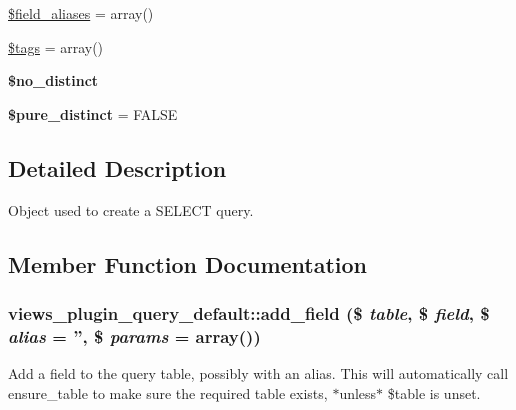 \begin{DoxyCompactItemize}
\item 
\hyperlink{classviews__plugin__query__default_a3e2bb7d60a731bf48eb852d963588eba}{\$field\_\-aliases} = array()
\item 
\hyperlink{classviews__plugin__query__default_a766a1b3fbce56e827df8270df72f3e3b}{\$tags} = array()
\item 
\hypertarget{classviews__plugin__query__default_a722a7a32c31be34500cdffa8d0ef5404}{
{\bfseries \$no\_\-distinct}}
\label{classviews__plugin__query__default_a722a7a32c31be34500cdffa8d0ef5404}

\item 
\hypertarget{classviews__plugin__query__default_a8116a6337a814b6f38191128b8971240}{
{\bfseries \$pure\_\-distinct} = FALSE}
\label{classviews__plugin__query__default_a8116a6337a814b6f38191128b8971240}

\end{DoxyCompactItemize}


\subsection{Detailed Description}
Object used to create a SELECT query. 

\subsection{Member Function Documentation}
\hypertarget{classviews__plugin__query__default_afeb9c22de8c015682431b41288248dbb}{
\subsubsection[{add\_\-field}]{\setlength{\rightskip}{0pt plus 5cm}views\_\-plugin\_\-query\_\-default::add\_\-field (\$ {\em table}, \/  \$ {\em field}, \/  \$ {\em alias} = {\ttfamily ''}, \/  \$ {\em params} = {\ttfamily array()})}}
\label{classviews__plugin__query__default_afeb9c22de8c015682431b41288248dbb}
Add a field to the query table, possibly with an alias. This will automatically call ensure\_\-table to make sure the required table exists, $\ast$unless$\ast$ \$table is unset.


